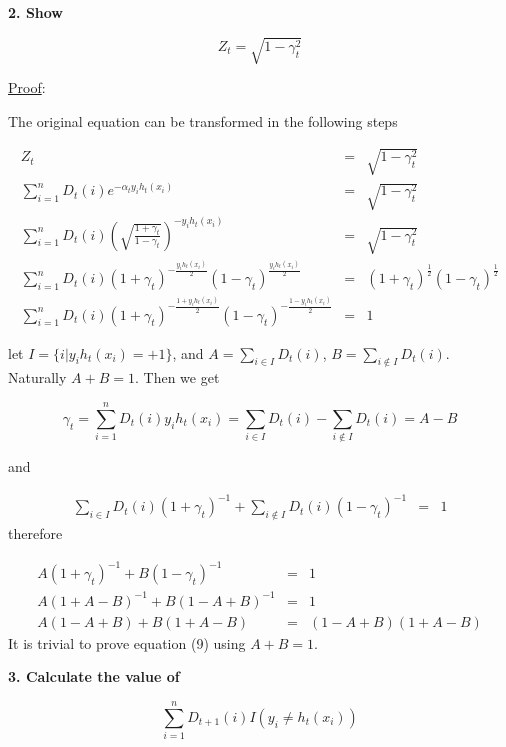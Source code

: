 \documentclass[UTF8]{ctexart}
\begin{document}
\vspace{10pt}
\textbf{2. Show}\par
\begin{equation*}
Z_{t}=\sqrt{1-\gamma_{t}^{2}}
\end{equation*}\par
\uline{Proof}:\par
The original equation can be transformed in the following steps\par
\begin{eqnarray}
Z_{t}&=&\sqrt{1-\gamma_{t}^{2}}\\
\sum_{i=1}^{n}D_{t}(i)e^{-\alpha_{t}y_{i}h_{t}(x_{i})}&=&\sqrt{1-\gamma_{t}^{2}}\\
\sum_{i=1}^{n}D_{t}(i)\left(\sqrt{\frac{1+\gamma_{t}}{1-\gamma_{t}}}\right)^{-y_{i}h_{t}(x_{i})}&=&\sqrt{1-\gamma_{t}^{2}}\\
\sum_{i=1}^{n}D_{t}(i)(1+\gamma_{t})^{-\frac{y_{i}h_{t}(x_{i})}{2}}(1-\gamma_{t})^{\frac{y_{i}h_{t}(x_{i})}{2}}&=&(1+\gamma_{t})^{\frac{1}{2}}(1-\gamma_{t})^{\frac{1}{2}}\\
\sum_{i=1}^{n}D_{t}(i)(1+\gamma_{t})^{-\frac{1+y_{i}h_{t}(x_{i})}{2}}(1-\gamma_{t})^{-\frac{1-y_{i}h_{t}(x_{i})}{2}}&=&1
\end{eqnarray}\par
let $I=\{i|y_{i}h_{t}(x_{i})=+1\}$, and $A=\sum_{i\in I}D_{t}(i)$, $B=\sum_{i\notin I}D_{t}(i)$. Naturally $A+B=1$. Then we get\par
\begin{equation*}
\gamma_{t}=\sum_{i=1}^{n}D_{t}(i)y_{i}h_{t}(x_{i})=\sum_{i\in I}D_{t}(i)-\sum_{i\notin I}D_{t}(i)=A-B
\end{equation*}\par
and\par
\begin{eqnarray}
\sum_{i\in I}D_{t}(i)(1+\gamma_{t})^{-1}+\sum_{i\notin I}D_{t}(i)(1-\gamma_{t})^{-1}&=&1
\end{eqnarray}
therefore\par
\begin{eqnarray}
A(1+\gamma_{t})^{-1}+B(1-\gamma_{t})^{-1}&=&1\\
A(1+A-B)^{-1}+B(1-A+B)^{-1}&=&1\\
A(1-A+B)+B(1+A-B)&=&(1-A+B)(1+A-B)
\end{eqnarray}
It is trivial to prove equation (9) using $A+B=1$.\par
\vspace{10pt}
\textbf{3. Calculate the value of}\par
\begin{equation*}
\sum_{i=1}^{n}D_{t+1}(i)I(y_{i}\neq h_{t}(x_{i}))
\end{equation*}\par
\end{document}
